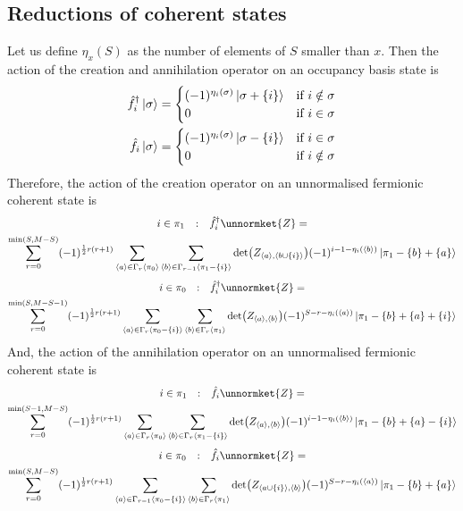 \documentclass[12pt]{article}
\newcommand{\seq}[1]{\langle #1\rangle}
\newcommand{\hc}{^\dagger}
\begin{document}
	\subsection{Reductions of coherent states}
	Let us define $\eta_x(S)$ as the number of elements of $S$ smaller than $x$. Then the action of the creation and annihilation operator on an occupancy basis state is
	\begin{eqnarray}
	\hat{f}\hc_i\ket{\sigma}=\begin{cases}
		(-1)^{\eta_i(\sigma)}\ket{\sigma + \{i\}} & \text{if }i\notin\sigma\\
		0 & \text{if }i\in\sigma
	\end{cases}\\
	\hat{f}_i\ket{\sigma}=\begin{cases}
		(-1)^{\eta_i(\sigma)}\ket{\sigma - \{i\}} & \text{if }i\in\sigma\\
		0 & \text{if }i\notin\sigma
	\end{cases}
	\end{eqnarray}
	Therefore, the action of the creation operator on an unnormalised fermionic coherent state is
	\begin{multline}
	i\in\pi_1\qq{:}\hat{f}\hc_{i}\unnormket{Z}=\\
	\sum_{r=0}^{\min(S,M-S)}(-1)^{\frac{1}{2}r(r+1)}\sum_{\seq{a}\in\Gamma_{r}\seq{\pi_0}}\sum_{\seq{b}\in\Gamma_{r-1}\seq{\pi_1-\{i\}}}\det(Z_{\seq{a},\seq{b\cup\{i\}}})(-1)^{i-1-\eta_i(\seq{b})}\ket{\pi_1-\{b\}+\{a\}}
	\end{multline}
	\begin{multline}
	i\in\pi_0\qq{:}\hat{f}\hc_{i}\unnormket{Z}=\\
	\sum_{r=0}^{\min(S,M-S-1)}(-1)^{\frac{1}{2}r(r+1)}\sum_{\seq{a}\in\Gamma_{r}\seq{\pi_0-\{i\}}}\sum_{\seq{b}\in\Gamma_{r}\seq{\pi_1}}\det(Z_{\seq{a},\seq{b}})(-1)^{S-r-\eta_i(\seq{a})}\ket{\pi_1-\{b\}+\{a\}+\{i\}}
	\end{multline}
	And, the action of the annihilation operator on an unnormalised fermionic coherent state is
	\begin{multline} \label{eq: pi_1 reduction action}
	i\in\pi_1\qq{:}\hat{f}_{i}\unnormket{Z}=\\
	\sum_{r=0}^{\min(S-1,M-S)}(-1)^{\frac{1}{2}r(r+1)}\sum_{\seq{a}\in\Gamma_r\seq{\pi_0}}\sum_{\seq{b}\in\Gamma_r\seq{\pi_1-\{i\}}}\det(Z_{\seq{a},\seq{b}})(-1)^{i-1-\eta_i(\seq{b})}\ket{\pi_1-\{b\}+\{a\}-\{i\}}
	\end{multline}
	\begin{multline} \label{eq: pi_0 reduction action}
	i\in\pi_0\qq{:}\hat{f}_{i}\unnormket{Z}=\\
	\sum_{r=0}^{\min(S,M-S)}(-1)^{\frac{1}{2}r(r+1)}\sum_{\seq{a}\in\Gamma_{r-1}\seq{\pi_0-\{i\}}}\sum_{\seq{b}\in\Gamma_r\seq{\pi_1}}\det(Z_{\seq{a\cup\{i\}},\seq{b}})(-1)^{S-r-\eta_i(\seq{a})}\ket{\pi_1-\{b\}+\{a\}}
	\end{multline}
\end{document}
